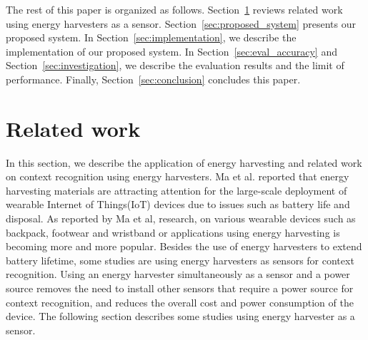 \documentclass[conference]{IEEEtran}
\begin{document}
The rest of this paper is organized as follows. Section~\ref{sec:related_work} reviews related work using energy harvesters as a sensor.
Section~\ref{sec:proposed_system} presents our proposed system.
In Section~\ref{sec:implementation}, we describe the implementation of our proposed system.
In Section~\ref{sec:eval_accuracy} and Section~\ref{sec:investigation}, we describe the evaluation results and the limit of performance.
Finally, Section~\ref{sec:conclusion} concludes this paper.

\section{Related work} \label{sec:related_work}
In this section, we describe the application of energy harvesting and related work on context recognition using energy harvesters.
Ma et al.\cite{ma2019sensing} reported that energy harvesting materials are attracting attention for the large-scale deployment of wearable Internet of Things(IoT) devices due to issues such as battery life and disposal.
As reported by Ma et al, research, on various wearable devices such as backpack\cite{xie2014human}, footwear\cite{zhao2014shoe} and wristband\cite{maharjan2019high} or applications\cite{Winkel2020gameboy,fraternali2020ember} using energy harvesting is becoming more and more popular.
Besides the use of energy harvesters to extend battery lifetime, some studies are using energy harvesters as sensors for context recognition.
Using an energy harvester simultaneously as a sensor and a power source removes the need to install other sensors that require a power source for context recognition, and reduces the overall cost and power consumption of the device.
The following section describes some studies using energy harvester as a sensor.
\end{document}
